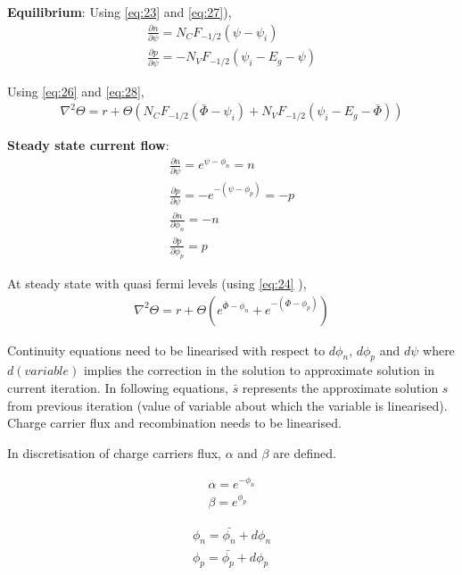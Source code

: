 \textbf{Equilibrium}:
Using \eqref{eq:23} and \eqref{eq:27}),
\begin{align*}
\frac{\partial n}{\partial \psi} =  N_C F_{-1/2}(\psi-\psi_i) \\
\frac{\partial p}{\partial \psi} = -N_V F_{-1/2}(\psi_i-E_g-\psi) \tag{2.8} \label{eq:28}
\end{align*} 

Using \eqref{eq:26} and \eqref{eq:28},
\begin{align*}
\nabla^2 \Theta = r + \Theta ( N_C F_{-1/2}(\bar{\Phi}-\psi_i) + N_V F_{-1/2}(\psi_i-E_g-\bar{\Phi})) \tag{2.9} \label{eq:29}
\end{align*} 

\textbf{Steady state current flow}:
\begin{align*}
\frac{\partial n}{\partial \psi} = e^{\psi-\phi_n} = n \\
\frac{\partial p}{\partial \psi} = -e^{-(\psi-\phi_p)} = -p \\
\frac{\partial n}{\partial \phi_n} = -n \\
\frac{\partial p}{\partial \phi_p} = p 
\tag{2.10} \label{eq:30}
\end{align*} 

At steady state with quasi fermi levels (using \eqref{eq:24} ),
\begin{align*}
\nabla^2 \Theta = r + \Theta ( e^{\bar{\Phi}-\phi_n} + e^{-(\bar{\Phi}-\phi_p)}) \tag{2.11} \label{eq:31}
\end{align*} 

Continuity equations need to be linearised with respect to $d\phi_n$, $d\phi_p$ and $d\psi$ where $d(variable)$ implies the correction in the solution to approximate solution in current iteration. In following equations, $\bar{s}$ represents the approximate solution $s$ from previous iteration (value of variable about which the variable is linearised). Charge carrier flux and recombination needs to be linearised.

In discretisation of charge carriers flux, $\alpha$ and $\beta$ are defined.

\begin{align*}
\alpha = e^{-\phi_n}  \\
\beta = e^{\phi_p}
\end{align*}

\begin{align*}
\phi_n = \bar{\phi_n} + d\phi_n   \\
\phi_p = \bar{\phi_p} + d\phi_p 
\end{align*}


